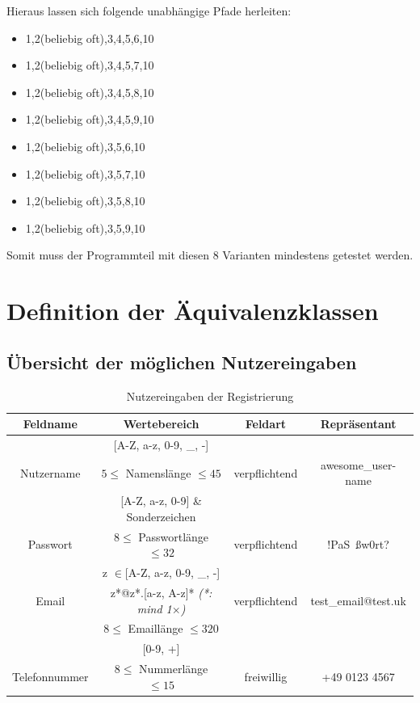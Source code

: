 Hieraus lassen sich folgende unabhängige Pfade herleiten:
\begin{itemize}{}{}
\item 1,2(beliebig oft),3,4,5,6,10
\item 1,2(beliebig oft),3,4,5,7,10
\item 1,2(beliebig oft),3,4,5,8,10
\item 1,2(beliebig oft),3,4,5,9,10
\item 1,2(beliebig oft),3,5,6,10
\item 1,2(beliebig oft),3,5,7,10
\item 1,2(beliebig oft),3,5,8,10
\item 1,2(beliebig oft),3,5,9,10
\end{itemize}

Somit muss der Programmteil mit diesen 8 Varianten mindestens getestet werden.

\section{Definition der Äquivalenzklassen}

	\subsection{Übersicht der möglichen Nutzereingaben}
	
		\begin{table}[!h]
			\centering
			\begin{tabular}{c|c|c|c}
				\textbf{Feldname}&\textbf{Wertebereich} & \textbf{Feldart} &\textbf{Repräsentant} \\  
				\hline
							  	&  [A-Z, a-z, 0-9, \_, -]			 	&&\\ 
				Nutzername		& \(5 \leq \) Namenslänge \(\leq 45\) 	&verpflichtend&awesome\_user-name\\ \hline
								& [A-Z, a-z, 0-9] \& Sonderzeichen 		&&\\  
				Passwort		& \(8 \leq \) Passwortlänge \(\leq 32\)	&verpflichtend&!PaS~ßw0rt?\\\hline
								& z \(\in\)[A-Z, a-z, 0-9, \_, -] 		&&\\
				Email			& z*@z*.[a-z, A-z]* \textit{(*: mind 1\(\times\))} 		& verpflichtend&test\_email@test.uk\\
								& \(8 \leq \) Emaillänge \(\leq 320\) 	&&\\\hline
								& [0-9, +]								&&\\
				Telefonnummer	&\(8 \leq \) Nummerlänge \(\leq 15\)	&freiwillig&+49 0123 4567\\
			\end{tabular}
			\caption{Nutzereingaben der Registrierung}
			\label{tab:eingabe-nutzerregistrierung}
		\end{table}
		\noindent
		
